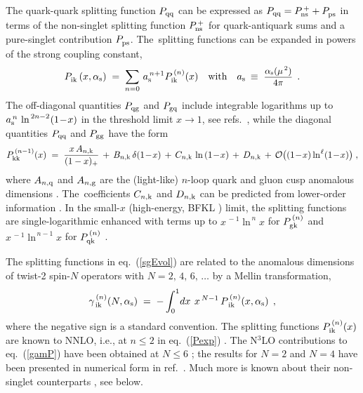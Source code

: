 \documentclass[12pt]{article}
\newcommand{\beq}{\begin{equation}}
\newcommand{\eeq}{\end{equation}}
\newcommand{\ra}{\rightarrow}
\newcommand{\als}{\alpha_{\rm s}}
\newcommand{\ars}{a_{\rm s}}
\def\frct#1#2{\mbox{\small{$\displaystyle\frac{#1}{#2}$}}}
\def\ar(#1){{a_{\rm s}^{\,#1}}}
\def\mus{{\mu^{\,2}}}
\def\xm1{{(1 \! - \! x)}}
\begin{document}
The quark-quark splitting function $P_{\rm qq}$ can be expressed as 
$ P_{\rm qq} = P_{\rm ns}^{\,+} + P_{\rm ps}^{} $ 
in terms of the non-singlet splitting function $P_{\rm ns}^{\,+}$ for 
quark-antiquark sums and a pure-singlet contribution $P_{\rm ps}^{}$. 
The~splitting functions can be expanded in powers of the strong coupling 
constant,
%
\beq
\label{Pexp}
 P_{\rm ik}^{}\left(x,\als\right) \; = \; \sum_{n=0}\,
  \ar(n+1) P^{\,(n)}_{\rm ik}(x)
\quad \mbox{with} \quad \ars \:\equiv\; \frct{\als(\mus)}{4\pi}
  \:\: .
\eeq
%
The off-diagonal quantities $P_{\rm qg}$ and $P_{\rm gq}$ include integrable
logarithms up to $\ar(n)\,\ln^{\,2n-2\!}\xm1$ in the threshold limit $x \ra 1$, 
see refs.~\cite{OffDxto1}, while the diagonal quantities $P_{\rm qq}$ and 
$P_{\rm gg}$ have the form \cite{DMS05}
%
\beq
\label{xto1}
  P_{\rm kk}^{\,(n-1)}(x) \;=\;
        \frac{x\,A_{n,\rm k}}{(1-x)_+}
  \,+\, B_{n,\rm k} \, \delta \xm1
  \,+\, C_{n,\rm k} \, \ln \xm1
  \,+\, D_{n,\rm k} \,+\, {\cal O}\big( \xm1 \ln^{\:\!\ell\!} \xm1 \big)
\; ,
\eeq
%
where $A_{n,\rm q}$ and $A_{n,\rm g}$ are the (light-like) $n$-loop quark and 
gluon cusp anomalous dimensions \cite{Korch89}. The~coefficients $C_{n,\rm k}$
and $D_{n,\rm k}$ can be predicted from lower-order information 
\cite{DMS05,MRUVV1}. 
In the small-$x$ (high-energy, BFKL \cite{BFKL1}) limit, the splitting 
functions are single-logarithmic enhanced with terms up to 
$x^{\,-1}\ln^{\,n} x$ for $P_{\rm gk}^{\,(n)}$ and 
$x^{\,-1}\ln^{\,n-1} x$ for $P_{\rm qk}^{\,(n)}$ \cite{BFKL2}.
 
The splitting functions in eq.~(\ref{sgEvol}) are related to the anomalous 
dimensions of twist-2 spin-$N$ operators with $N = 2,\, 4,\, 6,\, \ldots$ 
by a Mellin transformation,
% 
\beq
\label{gamP}
  \gamma_{\,\rm ik}^{\,(n)}(N,\als) \; = \;
  - \int_0^1 \!dx\:\, x^{\,N-1}\, P_{\,\rm ik}^{\,(n)}(x,\als) 
\:\: ,
\eeq
%
where the negative sign is a standard convention.
The splitting functions $P^{\,(n)}_{\rm ik}(x)$ are known to NNLO, i.e., 
at $n \leq 2$ in eq.~(\ref{Pexp}) \cite{MVV34}. 
The N$^3$LO contributions to eq.~(\ref{gamP}) have been obtained at 
$N \leq 6$ \cite{avRC17}; the results for $N = 2$ and $N = 4$ have been
presented in numerical form in ref.~\cite{avLL16}. 
Much more is known about their non-singlet counterparts \cite{DRUVV,MRUVV1},
see below.
\end{document}

